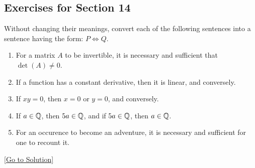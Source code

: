 \subsection{Exercises for Section 14}
\begin{exercise}\label{ex:2.14}
    Without changing their meanings, convert each of the following sentences into a sentence having the form: $P\Leftrightarrow Q$. 
    \begin{enumerate}
        \item For a matrix $A$ to be invertible, it is necessary and sufficient that $\det(A)\ne0$. 
        \item If a function has a constant derivative, then it is linear, and conversely. 
        \item If $xy=0$, then $x=0$ or $y=0$, and conversely. 
        \item If $a\in\mathbb{Q}$, then $5a\in\mathbb{Q}$, and if $5a\in\mathbb{Q}$, then $a\in\mathbb{Q}$. 
        \item For an occurence to become an adventure, it is necessary and sufficient for one to recount it. 
    \end{enumerate}
\end{exercise}\hyperref[sol:2.14]{[Go to Solution]}